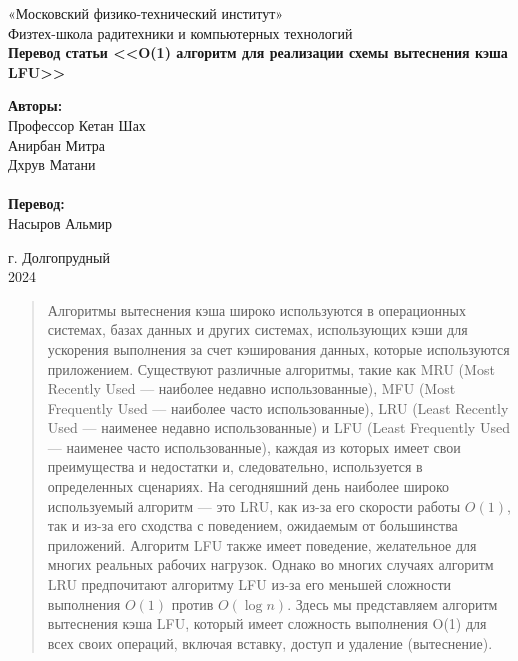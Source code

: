 \documentclass[a4paper, 12pt]{article}
\begin{document}
    

\thispagestyle{empty}

\begin{center}
\large{«Московский физико-технический институт»} \\  
\large{Физтех-школа радитехники и компьютерных технологий }\\
\vspace*{8cm}
{\bfseries
    {\Huge Перевод статьи <<O(1) алгоритм для реализации схемы вытеснения кэша LFU>>}
}
\end{center}

\vspace*{1cm}
\begin{flushright}

    \textbf{Авторы:} \\ Профессор Кетан Шах \\ Анирбан Митра \\ Дхрув Матани \\ 
    \hspace*{1cm} \\
    \textbf{Перевод:} \\Насыров Альмир

\end{flushright}

\vspace*{9cm}
\begin{center}
\small{г. Долгопрудный\\2024}
\end{center}

\newpage

\begin{abstract}
    Алгоритмы вытеснения кэша широко используются в операционных системах, базах данных и других системах, использующих кэши для ускорения выполнения за счет кэширования данных, которые используются приложением. Существуют различные алгоритмы, такие как MRU (Most Recently Used — наиболее недавно использованные), MFU (Most Frequently Used — наиболее часто использованные), LRU (Least Recently Used — наименее недавно использованные) и LFU (Least Frequently Used — наименее часто использованные), каждая из которых имеет свои преимущества и недостатки и, следовательно, используется в определенных сценариях. На сегодняшний день наиболее широко используемый алгоритм — это LRU, как из-за его скорости работы $O(1)$, так и из-за его сходства с поведением, ожидаемым от большинства приложений. Алгоритм LFU также имеет поведение, желательное для многих реальных рабочих нагрузок. Однако во многих случаях алгоритм LRU предпочитают алгоритму LFU из-за его меньшей сложности выполнения $O(1)$ против $O(\log{n})$. Здесь мы представляем алгоритм вытеснения кэша LFU, который имеет сложность выполнения O(1) для всех своих операций, включая вставку, доступ и удаление (вытеснение).
\end{abstract}
\end{document}
